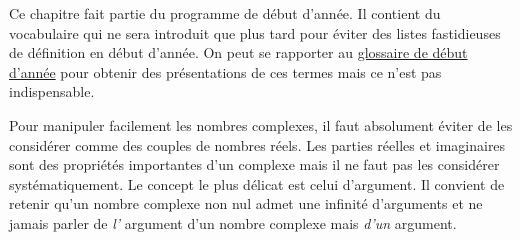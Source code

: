 

Ce chapitre fait partie du programme de début d'année. Il contient du vocabulaire qui ne sera introduit que plus tard pour éviter des listes fastidieuses de définition en début d'année. On peut se rapporter au \href{\baseurl C4199.pdf}{glossaire de début d'année} pour obtenir des présentations de ces termes mais ce n'est pas indispensable.

Pour manipuler facilement les nombres complexes, il faut absolument éviter de les considérer comme des couples de nombres réels. Les parties réelles et imaginaires sont des propriétés importantes d'un complexe mais il ne faut pas les considérer systématiquement. Le concept le plus délicat est celui d'argument. Il convient de retenir qu'un nombre complexe non nul admet une infinité d'arguments et ne jamais parler de \emph{l'} argument d'un nombre complexe mais \emph{d'un} argument. 

